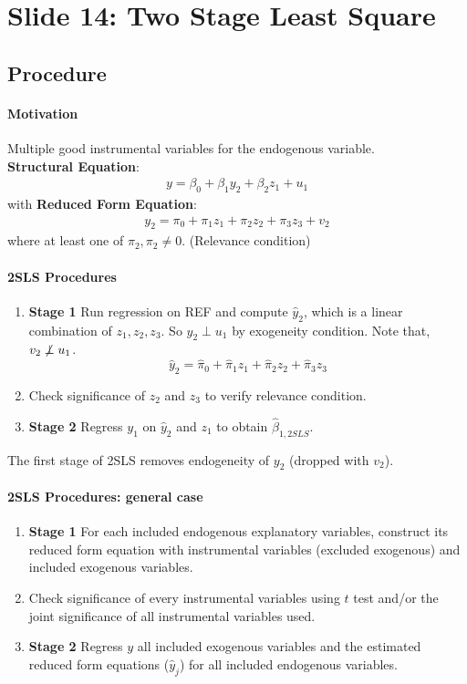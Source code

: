 \documentclass[]{article}
\begin{document}
	\section{Slide 14: Two Stage Least Square}
	\subsection{Procedure}
		\paragraph{Motivation} Multiple good instrumental variables for the endogenous variable. \\
		\textbf{Structural Equation}: 
		\begin{gather}
			y = \beta_0 + \beta_1 y_2 + \beta_2 z_1 + u_1
		\end{gather}
		with \textbf{Reduced Form Equation}:
		\begin{gather}
			y_2 = \pi_0 + \pi_1 z_1 + \pi_2 z_2 + \pi_3 z_3 + v_2
		\end{gather}
		where at least one of $\pi_2, \pi_2 \neq 0$. (Relevance condition) \\
		\paragraph{2SLS Procedures}
		\begin{enumerate}
			\item \textbf{Stage 1} Run regression on REF and compute $\hat{y}_2$, which is a linear combination of $z_1, z_2, z_3$. So $\hat{y}_2 \perp u_1$ by exogeneity condition. Note that, $v_2 \centernot \perp u_1$.
			\[
				\hat{y}_2 = \hat{\pi}_0 + \hat{\pi}_1 z_1 + \hat{\pi}_2 z_2 + \hat{\pi}_3 z_3
			\]
			\item Check significance of $z_2$ and $z_3$ to verify relevance condition. 
			\item \textbf{Stage 2} Regress $y_1$ on $\hat{y}_2$ and $z_1$ to obtain $\hat{\beta}_{1, 2SLS}$.
		\end{enumerate}
		
		\begin{remark}
			The first stage of 2SLS removes endogeneity of $y_2$ (dropped with $v_2$).
		\end{remark}

		\paragraph{2SLS Procedures: general case}
		\begin{enumerate}
			\item \textbf{Stage 1} For each included endogenous explanatory variables, construct its reduced form equation with instrumental variables (excluded exogenous) and included exogenous variables.
			\item Check significance of every instrumental variables using $t$ test and/or the joint significance of all instrumental variables used.
			\item \textbf{Stage 2} Regress $y$ all included exogenous variables and the estimated reduced form equations ($\hat{y}_j$) for all included endogenous variables.
		\end{enumerate}		
\end{document}
